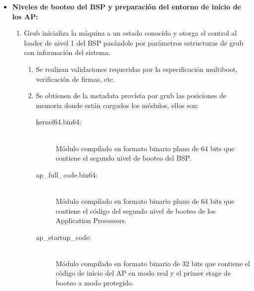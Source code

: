 \documentclass{beamer}
\begin{document}
	\begin{frame}
			\begin{itemize}
		\item \textbf{Niveles de booteo del BSP y preparación del entorno de inicio de los AP:} 
			\begin{enumerate}
				\item Grub inicializa la máquina a un estado conocido y otorga el control al loader de nivel 1 del BSP pasándole por parámetros estructuras de grub con información del sistema.
				\begin{enumerate}
					\item Se realizan validaciones requeridas por la especificación multiboot, verificación de firmas, etc.
					
					\item Se obtienen de la metadata provista por grub las posiciones de memoria donde están cargados los módulos, ellos son:
					\vspace{0.1cm}
					\begin{description}
						\item [kernel64.bin64:] \hfill \\
							Módulo compilado en formato binario plano de 64 bits que contiene el segundo nivel de booteo del BSP.
						\item [ap\_full\_code.bin64:] \hfill \\
							Módulo compilado en formato binario plano de 64 bits que contiene el código del segundo nivel de booteo de los Application Processors.
						\item [ap\_startup\_code:] \hfill \\
							Módulo compilado en formato binario de 32 bits que contiene el código de inicio del AP en modo real y el primer stage de booteo a modo protegido.
					\end{description}
					\vspace{0.5cm}
					

\end{enumerate}
\end{enumerate}
\end{itemize}
\end{frame}
\end{document}
